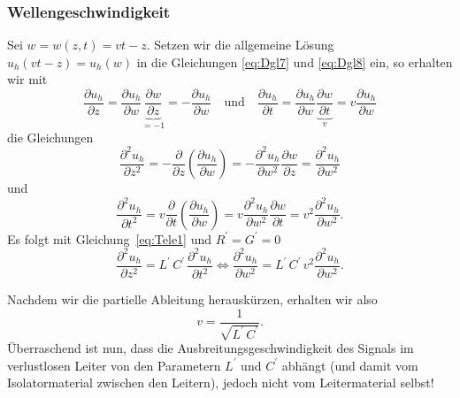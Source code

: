 \documentclass[paper=a4, parskip=half-, ngerman, fontsize=11pt]{scrreprt}
\begin{document}
\subsubsection{Wellengeschwindigkeit}

Sei \mbox{$w = w(z, t) = v t - z$}. Setzen wir die allgemeine Lösung \mbox{$u_{h}(v t - z) = u_{h}(w)$} in die
Gleichungen \eqref{eq:Dgl7} und \eqref{eq:Dgl8} ein, so erhalten wir mit
\begin{equation*}
    \frac{\partial u_{h}}{\partial z} = \frac{\partial u_{h}}{\partial w}
    \underbrace{\frac{\partial w}{\partial z}}_{=-1} = - \frac{\partial u_{h}}{\partial w}
    \quad \text{und} \quad
    \frac{\partial u_{h}}{\partial t} = \frac{\partial u_{h}}{\partial w}
    \underbrace{\frac{\partial w}{\partial t}}_{v} = v \frac{\partial u_{h}}{\partial w}
\end{equation*}
die Gleichungen
\begin{equation*}
    \frac{\partial^{2} u_{h}}{\partial z^{2}} = - \frac{\partial}{\partial z} \left( \frac{\partial u_{h}}{\partial w}
    \right) = - \frac{\partial^{2} u_{h}}{\partial w^{2}} \frac{\partial w}{\partial z} = \frac{\partial^{2}
    u_{h}}{\partial w^{2}}
\end{equation*}
und
\begin{equation*}
    \frac{\partial^{2} u_{h}}{\partial t^{2}} = v \frac{\partial}{\partial t} \left( \frac{\partial u_{h}}{\partial w}
    \right) = v \frac{\partial^{2} u_{h}}{\partial w^{2}} \frac{\partial w}{\partial t} =v^{2} \frac{\partial^{2}
        u_{h}}{\partial w^{2}}.
\end{equation*}
Es folgt mit Gleichung~\eqref{eq:Tele1} und \mbox{$R^{\prime} = G^{\prime} = 0$}
\begin{equation*}
    \frac{\partial^{2} u_{h}}{\partial z^{2}} = L^{\prime} \, C^{\prime} \, \frac{\partial^{2} u_{h}}{\partial t^{2}}
    \Leftrightarrow
    \frac{\partial^{2} u_{h}}{\partial w^{2}} = L^{\prime} \, C^{\prime} \, v^{2} \frac{\partial^{2} u_{h}}{\partial
    w^{2}}.
\end{equation*}

Nachdem wir die partielle Ableitung herauskürzen, erhalten wir also
\begin{equation}
    v = \frac{1}{\sqrt{L^{\prime} \, C^{\prime}}} \label{eq:WellenGeschw1}.
\end{equation}
Überraschend ist nun, dass die Ausbreitungsgeschwindigkeit des Signals im verlustlosen Leiter von den Parametern
$L^{\prime}$ und $C^{\prime}$ abhängt (und damit vom Isolatormaterial zwischen den Leitern), jedoch nicht vom
Leitermaterial selbst!
\end{document}
